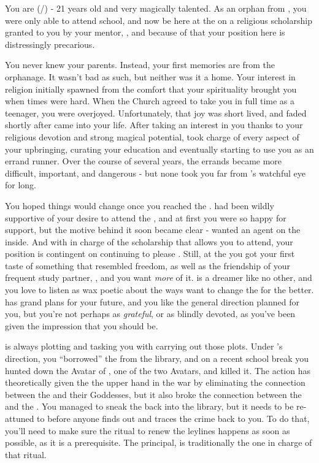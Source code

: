 \documentclass[char]{GL2020}
\begin{document}
\name{\cScholarship{}}

You are \cScholarship{\full} (\cScholarship{\they}/\cScholarship{\them}) - 21 years old and very magically talented. As an orphan from \pTech{}, you were only able to attend school, and now be here at the \pSchool{} on a religious scholarship granted to you by your mentor, \cAntiChup{\full}, and because of that your position here is distressingly precarious.

You never knew your parents. Instead, your first memories are from the orphanage. It wasn't bad as such, but neither was it a home. Your interest in religion initially spawned from the comfort that your spirituality brought you when times were hard. When the Church agreed to take you in full time as a teenager, you were overjoyed. Unfortunately, that joy was short lived, and faded shortly after \cAntiChup{} came into your life. After taking an interest in you thanks to your religious devotion and strong magical potential, \cAntiChup{} took charge of every aspect of your upbringing, curating your education and eventually starting to use you as an errand runner. Over the course of several years, the errands became more difficult, important, and dangerous - but none took you far from \cAntiChup{}'s watchful eye for long.

You hoped things would change once you reached the \pSchool{}. \cAntiChup{} had been wildly supportive of your desire to attend the \pSc{}, and at first you were so happy for \cAntiChup{\their} support, but the motive behind it soon became clear - \cAntiChup{\they} wanted an agent on the inside. And with \cAntiChup{} in charge of the scholarship that allows you to attend, your position is contingent on continuing to please \cAntiChup{\them}. Still, at the \pSchool{} you got your first taste of something that resembled freedom, as well as the friendship of your frequent study partner, \cTechStar{\full}, and you want \emph{more} of it. \cTechStar{} is a dreamer like no other, and you love to listen as \cTechStar{\they} wax\cTechStar{\pluralC} poetic about the ways \cTechStar{\they} want\cTechStar{\plural} to change the \pTech{} for the better. \cAntiChup{} has grand plans for your future, and you like the general direction planned for you, but you're not perhaps as \emph{grateful}, or as blindly devoted, as you've been given the impression that you should be.

\cAntiChup{} is always plotting and tasking you with carrying out those plots. Under \cAntiChup{}'s direction, you ``borrowed'' the \iScythe{} from the \pSc{} library, and on a recent school break you hunted down the Avatar of \cEbbFull{}, one of the two \pShip{} Avatars, and killed it. The action has theoretically given the \pTech{} the upper hand in the war by eliminating the connection between the \pShip{} and their Goddesses, but it also broke the connection between the \iScythe{} and the \pFarm{}. You managed to sneak the \iScythe{} back into the library, but it needs to be re-attuned to \pFarm{} before anyone finds out and traces the crime back to you. To do that, you'll need to make sure the ritual to renew the leylines happens as soon as possible, as it is a prerequisite. The principal, \cPrincipal{\full} is traditionally the one in charge of that ritual. 
\end{document}
